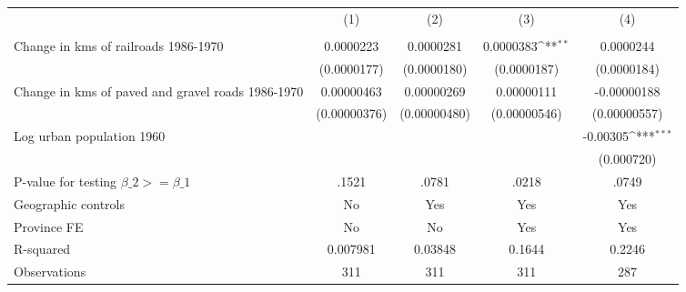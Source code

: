 {
\def\sym#1{\ifmmode^{#1}\else\(^{#1}\)\fi}
\begin{tabular}{l*{4}{c}}
\hline\hline
                &\multicolumn{1}{c}{(1)}&\multicolumn{1}{c}{(2)}&\multicolumn{1}{c}{(3)}&\multicolumn{1}{c}{(4)}\\
                &\multicolumn{1}{c}{}&\multicolumn{1}{c}{}&\multicolumn{1}{c}{}&\multicolumn{1}{c}{}\\
\hline
Change in kms of railroads 1986-1970&0.0000223         &0.0000281         &0.0000383\sym{**} &0.0000244         \\
                &(0.0000177)         &(0.0000180)         &(0.0000187)         &(0.0000184)         \\
[1em]
Change in kms of paved and gravel roads 1986-1970&0.00000463         &0.00000269         &0.00000111         &-0.00000188         \\
                &(0.00000376)         &(0.00000480)         &(0.00000546)         &(0.00000557)         \\
[1em]
Log urban population 1960&                  &                  &                  & -0.00305\sym{***}\\
                &                  &                  &                  &(0.000720)         \\
\hline
P-value for testing $\beta\_{2} >= \beta\_{1}$&    .1521         &    .0781         &    .0218         &    .0749         \\
Geographic controls&       No         &      Yes         &      Yes         &      Yes         \\
Province FE     &       No         &       No         &      Yes         &      Yes         \\
R-squared       & 0.007981         &  0.03848         &   0.1644         &   0.2246         \\
Observations    &      311         &      311         &      311         &      287         \\
\hline\hline
\end{tabular}
}
